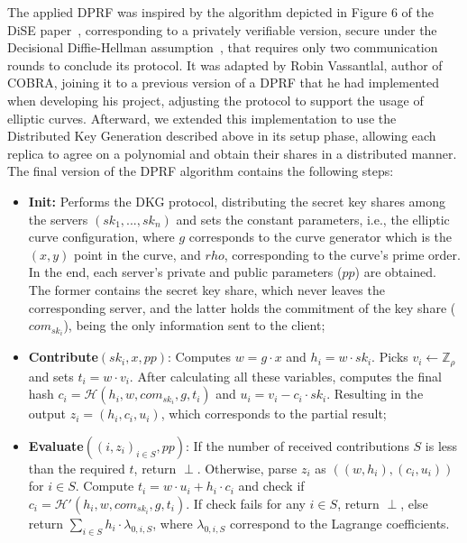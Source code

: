 The applied DPRF was inspired by the algorithm depicted in Figure 6 of the DiSE paper~\cite{dise}, corresponding to a privately verifiable version, secure under the Decisional Diffie-Hellman assumption~\cite{ddh}, that requires only two communication rounds to conclude its protocol. It was adapted by Robin Vassantlal, author of COBRA, joining it to a previous version of a DPRF that he had implemented when developing his project, adjusting the protocol to support the usage of elliptic curves. Afterward, we extended this implementation to use the Distributed Key Generation described above in its setup phase, allowing each replica to agree on a polynomial and obtain their shares in a distributed manner. The final version of the DPRF algorithm contains the following steps:
\begin{itemize}
    \item \textbf{Init:} Performs the DKG protocol, distributing the secret key shares among the servers $(sk_1, ..., sk_n)$ and sets the constant parameters, i.e., the elliptic curve configuration, where $g$ corresponds to the curve generator which is the $(x, y)$ point in the curve, and $rho$, corresponding to the curve's prime order. In the end, each server's private and public parameters ($pp$) are obtained. The former contains the secret key share, which never leaves the corresponding server, and the latter holds the commitment of the key share ($com_{sk_i}$), being the only information sent to the client;

    \item \textbf{Contribute}$(sk_i, x, pp)$: Computes $w = g \cdot x$ and $h_i = w \cdot sk_i$. Picks $v_i \leftarrow \mathbb{Z}_\rho$ and sets $t_i = w \cdot v_i$. After calculating all these variables, computes the final hash $c_i = \mathcal{H}(h_i, w, com_{sk_i}, g, t_i)$ and $u_i = v_i - c_i \cdot sk_i$. Resulting in the output $z_i = (h_i, c_i, u_i)$, which corresponds to the partial result;

    \item \textbf{Evaluate}$({(i, z_i)}_{i \in S}, pp)$: If the number of received contributions $S$ is less than the required $t$, return $\perp$. Otherwise, parse $z_i$ as $((w, h_i), (c_i, u_i))$ for $i \in S$. Compute $t_i = w \cdot u_i + h_i \cdot c_i$ and check if $c_i = \mathcal{H}'(h_i, w, com_{sk_i}, g, t_i)$. If check fails for any $i \in S$, return $\perp$, else return $\sum_{i \in S}h_i \cdot \lambda_{0, i, S}$, where $\lambda_{0, i, S}$ correspond to the Lagrange coefficients.
\end{itemize}

